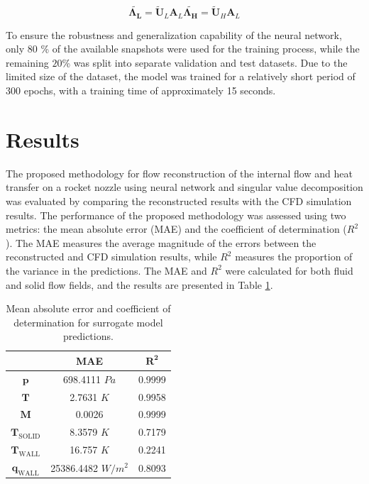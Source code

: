\documentclass[10pt,oneside,a4paper,twocolumn]{article}
\begin{document}
\begin{equation}
    \tilde{\mathbf{\Lambda_L}}= \tilde{\mathbf{U}}_L \mathbf{A}_L 
    \tilde{\mathbf{\Lambda_H}}= \tilde{\mathbf{U}}_H \mathbf{A}_L
    \label{eq:projected_matrices}
\end{equation}

To ensure the robustness and generalization capability of the neural network, only $80$ \% of the available snapshots were used for the training process, while the remaining $20$\% was split into separate validation and test datasets. Due to the limited size of the dataset, the model was trained for a relatively short period of $300$ epochs, with a training time of approximately 15 seconds.

\section{Results}

The proposed methodology for flow reconstruction of the internal flow and heat transfer on a rocket nozzle using neural network and singular value decomposition was evaluated by comparing the reconstructed results with the CFD simulation results. The performance of the proposed methodology was assessed using two metrics: the mean absolute error (MAE) and the coefficient of determination ($R^2$). The MAE measures the average magnitude of the errors between the reconstructed and CFD simulation results, while $R^2$ measures the proportion of the variance in the predictions. The MAE and $R^2$ were calculated for both fluid and solid flow fields, and the results are presented in Table \ref{tab:error}.

\begin{table}[h]
  \centering
  \begin{tabular}{ccc}
    \hline
      & \textbf{MAE}  & $\mathbf{R^2}$ \\
    \hline
    \hline
    $\mathbf{p}$          & 698.4111 $Pa$        & 0.9999 \\
    $\mathbf{T}$       & 2.7631   $K$         & 0.9958 \\
    $\mathbf{M}$              & 0.0026             & 0.9999 \\
    $\mathbf{T}_{\text{SOLID}}$ & 8.3579  $K$          & 0.7179 \\
    $\mathbf{T}_{\text{WALL}}$  & 16.757   $K$         & 0.2241 \\
    $\mathbf{q}_{\text{WALL}}$    & 25386.4482  $W/m^2$  & 0.8093 \\
    \hline
  \end{tabular}
  \caption{Mean absolute error and coefficient of determination for surrogate model predictions.}
  \label{tab:error}
\end{table}
\end{document}
